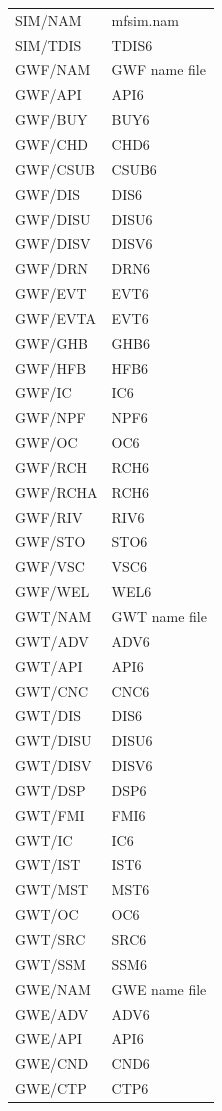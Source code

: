 \begin{longtable}{p{6cm} p{4cm}}
SIM/NAM & mfsim.nam \\
SIM/TDIS & TDIS6 \\
\hline
GWF/NAM & GWF name file \\
GWF/API & API6 \\
GWF/BUY & BUY6 \\
GWF/CHD & CHD6 \\
GWF/CSUB & CSUB6 \\
GWF/DIS & DIS6 \\
GWF/DISU & DISU6 \\
GWF/DISV & DISV6 \\
GWF/DRN & DRN6 \\
GWF/EVT & EVT6 \\
GWF/EVTA & EVT6 \\
GWF/GHB & GHB6 \\
GWF/HFB & HFB6 \\
GWF/IC & IC6 \\
GWF/NPF & NPF6 \\
GWF/OC & OC6 \\
GWF/RCH & RCH6 \\
GWF/RCHA & RCH6 \\
GWF/RIV & RIV6 \\
GWF/STO & STO6 \\
GWF/VSC & VSC6 \\
GWF/WEL & WEL6 \\
\hline
GWT/NAM & GWT name file \\
GWT/ADV & ADV6 \\
GWT/API & API6 \\
GWT/CNC & CNC6 \\
GWT/DIS & DIS6 \\
GWT/DISU & DISU6 \\
GWT/DISV & DISV6 \\
GWT/DSP & DSP6 \\
GWT/FMI & FMI6 \\
GWT/IC & IC6 \\
GWT/IST & IST6 \\
GWT/MST & MST6 \\
GWT/OC & OC6 \\
GWT/SRC & SRC6 \\
GWT/SSM & SSM6 \\
\hline
GWE/NAM & GWE name file \\
GWE/ADV & ADV6 \\
GWE/API & API6 \\
GWE/CND & CND6 \\
GWE/CTP & CTP6 \\

\end{longtable}
